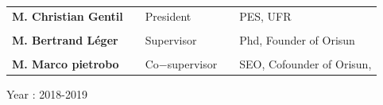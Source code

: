 \documentclass[11pt]{report}           %
\begin{document}
\begin{titlepage}
\begin{table}[h!]
\centering
  \begin{tabular}{lllll}
\bf{M. Christian Gentil}   & & President & & PES, UFR \\
           & &  & & \\
 
 \bf{M. Bertrand Léger }   & & Supervisor & & Phd, Founder of Orisun\\
           & &  & & \\
\bf{M. Marco pietrobo }   & & Co$-$supervisor & & SEO, Cofounder of Orisun,
\end{tabular}
\end{table}

\large{


\vspace{0.7cm}

\begin{center}
	Year : 2018-2019
\end{center}
}

\end{titlepage}




\end{document}
